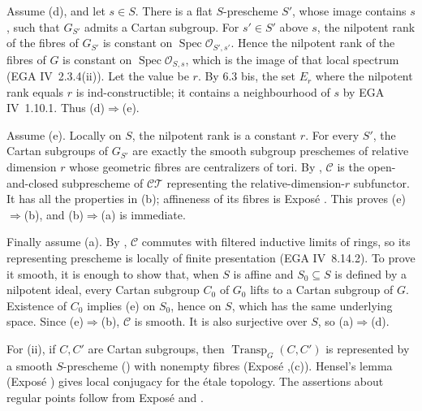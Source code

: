 Assume (d), and let \(s\in S\). There is a flat \(S\)-prescheme
\(S'\), whose image contains \(s\), such that \(G_{S'}\) admits a
Cartan subgroup. For \(s'\in S'\) above \(s\), the nilpotent rank of
the fibres of \(G_{S'}\) is constant on
\(\operatorname{Spec}\mathcal O_{S',s'}\). Hence the nilpotent rank
of the fibres of \(G\) is constant on
\(\operatorname{Spec}\mathcal O_{S,s}\), which is the image of that
local spectrum (EGA IV~2.3.4(ii)). Let the value be \(r\). By 6.3 bis,
the set \(E_r\) where the nilpotent rank equals \(r\) is
ind-constructible; it contains a neighbourhood of \(s\) by
EGA IV~1.10.1. Thus (d)\(\Rightarrow\)(e).

Assume (e). Locally on \(S\), the nilpotent rank is a constant \(r\).
For every \(S'\), the Cartan subgroups of \(G_{S'}\) are exactly the
smooth subgroup preschemes of relative dimension \(r\) whose
geometric fibres are centralizers of tori. By ,
\(\mathcal C\) is the open-and-closed subprescheme of
\(\mathcal{CT}\) representing the relative-dimension-\(r\)
subfunctor. It has all the properties in (b); affineness of its
fibres is Exposé . This proves
(e)\(\Rightarrow\)(b), and (b)\(\Rightarrow\)(a) is immediate.

Finally assume (a). By , \(\mathcal C\) commutes with filtered
inductive limits of rings, so its representing prescheme is locally
of finite presentation (EGA IV~8.14.2). To prove it smooth, it is
enough to show that, when \(S\) is affine and \(S_0\subseteq S\) is
defined by a nilpotent ideal, every Cartan subgroup \(C_0\) of
\(G_0\) lifts to a Cartan subgroup of \(G\). Existence of \(C_0\)
implies (e) on \(S_0\), hence on \(S\), which has the same underlying
space. Since (e)\(\Rightarrow\)(b), \(\mathcal C\) is smooth.
It is also surjective over \(S\), so (a)\(\Rightarrow\)(d).

For (ii), if \(C,C'\) are Cartan subgroups, then
\(\operatorname{Transp}_G(C,C')\) is represented by a smooth
\(S\)-prescheme () with nonempty fibres
(Exposé ,(c)). Hensel's lemma (Exposé ) gives local
conjugacy for the étale topology. The assertions about regular points
follow from Exposé  and .

